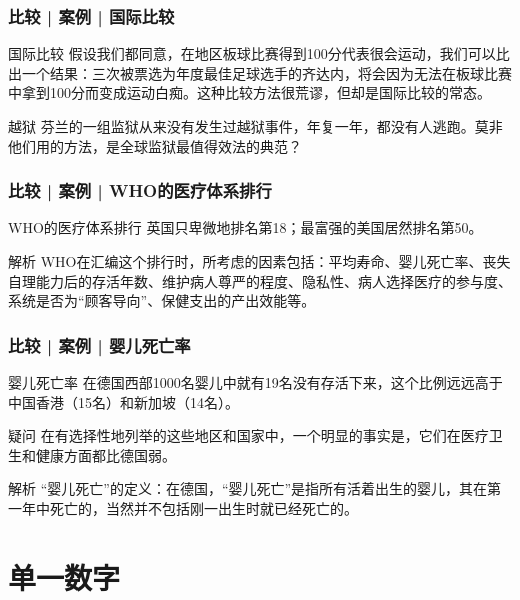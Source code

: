 \begin{frame}
  \frametitle{比较 | 案例 | 国际比较}
  \begin{block}{国际比较}
  假设我们都同意，在地区板球比赛得到100分代表很会运动，我们可以比出一个结果：三次被票选为年度最佳足球选手的齐达内，将会因为无法在板球比赛中拿到100分而变成运动白痴。这种比较方法很荒谬，但却是国际比较的常态。
  \end{block}
  \pause
  \begin{block}{越狱}
    芬兰的一组监狱从来没有发生过越狱事件，年复一年，都没有人逃跑。莫非他们用的方法，是全球监狱最值得效法的典范？
  \end{block}
\end{frame}

\begin{frame}
  \frametitle{比较 | 案例 | WHO的医疗体系排行}
  \begin{block}{WHO的医疗体系排行}
    英国只卑微地排名第18；最富强的美国居然排名第50。
  \end{block}
  \pause
  \begin{block}{解析}
WHO在汇编这个排行时，所考虑的因素包括：平均寿命、婴儿死亡率、丧失自理能力后的存活年数、维护病人尊严的程度、隐私性、病人选择医疗的参与度、系统是否为“顾客导向”、保健支出的产出效能等。
  \end{block}
\end{frame}

\begin{frame}
  \frametitle{比较 | 案例 | 婴儿死亡率}
  \begin{block}{婴儿死亡率}
    在德国西部1000名婴儿中就有19名没有存活下来，这个比例远远高于中国香港（15名）和新加坡（14名）。
  \end{block}
  \pause
  \begin{block}{疑问}
    在有选择性地列举的这些地区和国家中，一个明显的事实是，它们在医疗卫生和健康方面都比德国弱。
  \end{block}
  \pause \pause \pause \pause
  \begin{block}{解析}
    “婴儿死亡”的定义：在德国，“婴儿死亡”是指所有活着出生的婴儿，其在第一年中死亡的，当然并不包括刚一出生时就已经死亡的。
  \end{block}
\end{frame}

\section{单一数字}
